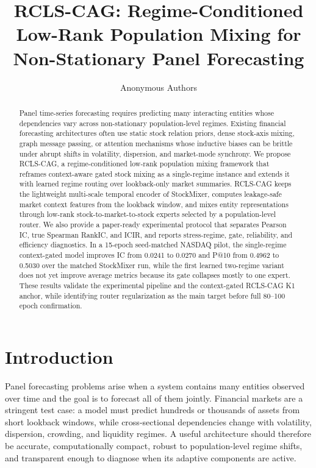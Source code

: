 \documentclass{article}
\title{RCLS-CAG: Regime-Conditioned Low-Rank Population Mixing for Non-Stationary Panel Forecasting}
\author{Anonymous Authors}
\begin{document}
\maketitle

\begin{abstract}
Panel time-series forecasting requires predicting many interacting entities whose dependencies vary across non-stationary population-level regimes. Existing financial forecasting architectures often use static stock relation priors, dense stock-axis mixing, graph message passing, or attention mechanisms whose inductive biases can be brittle under abrupt shifts in volatility, dispersion, and market-mode synchrony. We propose RCLS-CAG, a regime-conditioned low-rank population mixing framework that reframes context-aware gated stock mixing as a single-regime instance and extends it with learned regime routing over lookback-only market summaries. RCLS-CAG keeps the lightweight multi-scale temporal encoder of StockMixer, computes leakage-safe market context features from the lookback window, and mixes entity representations through low-rank stock-to-market-to-stock experts selected by a population-level router. We also provide a paper-ready experimental protocol that separates Pearson IC, true Spearman RankIC, and ICIR, and reports stress-regime, gate, reliability, and efficiency diagnostics. In a 15-epoch seed-matched NASDAQ pilot, the single-regime context-gated model improves IC from 0.0241 to 0.0270 and P@10 from 0.4962 to 0.5030 over the matched StockMixer run, while the first learned two-regime variant does not yet improve average metrics because its gate collapses mostly to one expert. These results validate the experimental pipeline and the context-gated RCLS-CAG K1 anchor, while identifying router regularization as the main target before full 80--100 epoch confirmation.
\end{abstract}

\section{Introduction}

Panel forecasting problems arise when a system contains many entities observed over time and the goal is to forecast all of them jointly. Financial markets are a stringent test case: a model must predict hundreds or thousands of assets from short lookback windows, while cross-sectional dependencies change with volatility, dispersion, crowding, and liquidity regimes. A useful architecture should therefore be accurate, computationally compact, robust to population-level regime shifts, and transparent enough to diagnose when its adaptive components are active.
\end{document}

